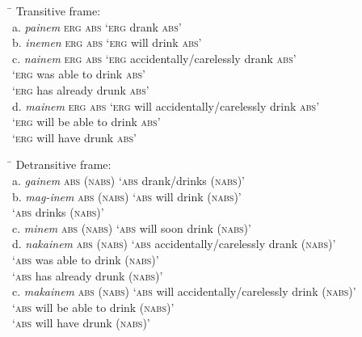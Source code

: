 \ea
\label{bkm:Ref148531334}
\begin{tabbing}
\hspace{4.5cm} \= \kill
Transitive frame: \\
a.  \textit{painem} \textsc{erg} \textsc{abs} \>  ‘\textsc{erg} drank \textsc{abs}’ \\
b.  \textit{inemen} \textsc{erg} \textsc{abs} \> ‘\textsc{erg} will drink \textsc{abs}’ \\
c.  \textit{nainem} \textsc{erg} \textsc{abs} \>  ‘\textsc{erg} accidentally/carelessly drank \textsc{abs}’ \\
\>      ‘\textsc{erg} was able to drink \textsc{abs}’ \\
\>      ‘\textsc{erg} has already drunk \textsc{abs}’ \\
d.  \textit{mainem} \textsc{erg} \textsc{abs} \>  ‘\textsc{erg} will accidentally/carelessly drink \textsc{abs}’ \\
\>      ‘\textsc{erg} will be able to drink \textsc{abs}’ \\
\>      ‘\textsc{erg} will have drunk \textsc{abs}’
\end{tabbing}
\z

\largerpage[2]
\ea
\begin{tabbing}
\hspace{4.5cm} \= \kill
\label{bkm:Ref148531341}Detransitive frame: \\
a.  \textit{gainem} \textsc{abs} (\textsc{nabs}) \> ‘\textsc{abs} drank/drinks (\textsc{nabs})’ \\
b.  \textit{mag{}-inem} \textsc{abs} (\textsc{nabs}) \> ‘\textsc{abs} will drink (\textsc{nabs})’ \\
\>      ‘\textsc{abs} drinks (\textsc{nabs})’ \\
c.  \textit{minem} \textsc{abs} (\textsc{nabs}) \> ‘\textsc{abs} will soon drink (\textsc{nabs})’ \\
d.  \textit{nakainem} \textsc{abs} (\textsc{nabs}) \> ‘\textsc{abs} accidentally/carelessly drank (\textsc{nabs})’ \\
\>      ‘\textsc{abs} was able to drink (\textsc{nabs})’ \\
\>      ‘\textsc{abs} has already drunk (\textsc{nabs})’ \\
c.  \textit{makainem} \textsc{abs} (\textsc{nabs}) \> ‘\textsc{abs} will accidentally/carelessly drink (\textsc{nabs})’ \\
\>      ‘\textsc{abs} will be able to drink (\textsc{nabs})’ \\
\>      ‘\textsc{abs} will have drunk (\textsc{nabs})’
\end{tabbing}
\z\clearpage

